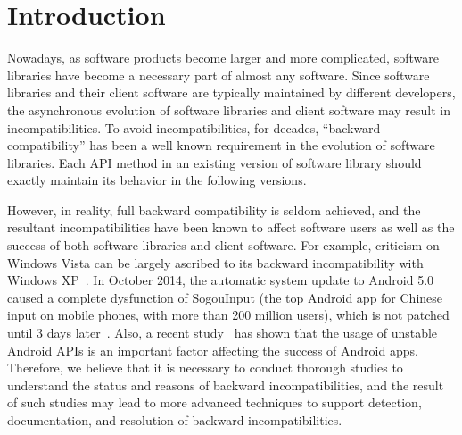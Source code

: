 \section{Introduction}
\label{sec:intro}
Nowadays, as software products become larger and more complicated, software libraries have become a necessary part of almost any software. Since software libraries and their client software are typically maintained by different developers, the asynchronous evolution of software libraries and client software may result in incompatibilities. To avoid incompatibilities, for decades, ``backward compatibility'' has been a well known requirement in the evolution of software libraries. Each API method in an existing version of software library should exactly maintain its behavior in the following versions. 



However, in reality, full backward compatibility is seldom achieved, and the resultant incompatibilities have been known to affect software users as well as the success of both software libraries and client software. For example, criticism on Windows Vista can be largely ascribed to its backward incompatibility with Windows XP~\cite{vista}. In October 2014, the automatic system update to Android 5.0 caused a complete dysfunction of SogouInput (the top Android app for Chinese input on mobile phones, with more than 200 million users), which is not patched until 3 days later~\cite{sougou}. Also, a recent study~\cite{Vasquez:AndroidAPI} has shown that the usage of unstable Android APIs is an important factor affecting the success of Android apps. Therefore, we believe that it is necessary to conduct thorough studies to understand the status and reasons of backward incompatibilities, and the result of such studies may lead to more advanced techniques to support detection, documentation, and resolution of backward incompatibilities. 




